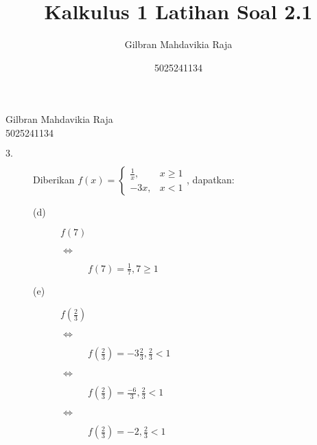 \documentclass{article}
\title{Kalkulus 1 Latihan Soal 2.1}
\author{Gilbran Mahdavikia Raja}
\date{5025241134}
\begin{document}
\begin{flushleft}
    Gilbran Mahdavikia Raja \\
    5025241134 \\
    \end{flushleft}
\begin{description}
    \item[$3.$] Diberikan $f(x) = \left\{ \begin{array}{rcl}\frac{1}{x}, &x\geq 1 \\ -3x, &x < 1\end{array}\right.$, dapatkan: 
    \begin{description}
        \item[(d)] $f(7)$ 
        \begin{description}
            \item[$\Leftrightarrow$] $f(7) = \frac{1}{7}, 7 \geq 1$
        \end{description}
        \item[(e)] $f(\frac{2}{3})$ 
        \begin{description}
            \item[$\Leftrightarrow$] $f(\frac{2}{3}) = -3\frac{2}{3}, \frac{2}{3} < 1$
            \item[$\Leftrightarrow$] $f(\frac{2}{3}) = \frac{-6}{3}, \frac{2}{3} < 1$
            \item[$\Leftrightarrow$] $f(\frac{2}{3}) = -2, \frac{2}{3} < 1$
        \end{description}
    \end{description}
\end{description}
\end{document}
